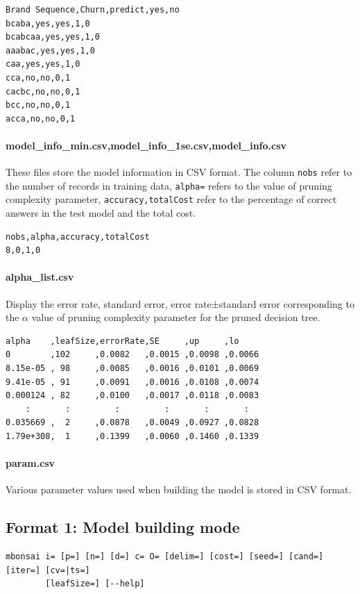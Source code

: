 \begin{Verbatim}[baselinestretch=0.7,frame=single]
Brand Sequence,Churn,predict,yes,no
bcaba,yes,yes,1,0
bcabcaa,yes,yes,1,0
aaabac,yes,yes,1,0
caa,yes,yes,1,0
cca,no,no,0,1
cacbc,no,no,0,1
bcc,no,no,0,1
acca,no,no,0,1
\end{Verbatim}

\paragraph{model\_info\_min.csv,model\_info\_1se.csv,model\_info.csv}

These files store the model information in CSV format. The column \verb|nobs| refer to the number of records in training data, \verb|alpha=| refers to the value of pruning complexity parameter, \verb|accuracy,totalCost| refer to the percentage of correct answers in the test model  and the total cost. 


\begin{Verbatim}[baselinestretch=0.7,frame=single]
nobs,alpha,accuracy,totalCost
8,0,1,0
\end{Verbatim}

\paragraph{alpha\_list.csv}
Display the error rate, standard error, error rate±standard error corresponding to the $\alpha$ value of pruning complexity parameter for the pruned decision tree.

\begin{Verbatim}[baselinestretch=0.7,frame=single]
alpha    ,leafSize,errorRate,SE     ,up     ,lo
0        ,102     ,0.0082   ,0.0015 ,0.0098 ,0.0066
8.15e-05 , 98     ,0.0085   ,0.0016 ,0.0101 ,0.0069
9.41e-05 , 91     ,0.0091   ,0.0016 ,0.0108 ,0.0074
0.000124 , 82     ,0.0100   ,0.0017 ,0.0118 ,0.0083
    :       :         :         :       :       : 
0.035669 ,  2     ,0.0878   ,0.0049 ,0.0927 ,0.0828
1.79e+308,  1     ,0.1399   ,0.0060 ,0.1460 ,0.1339
\end{Verbatim}

\paragraph{param.csv}
Various parameter values used when building the model is stored in CSV format.


\subsection{Format 1: Model building mode}
\begin{verbatim}
mbonsai i= [p=] [n=] [d=] c= O= [delim=] [cost=] [seed=] [cand=] [iter=] [cv=|ts=]
        [leafSize=] [--help]
\end{verbatim}

